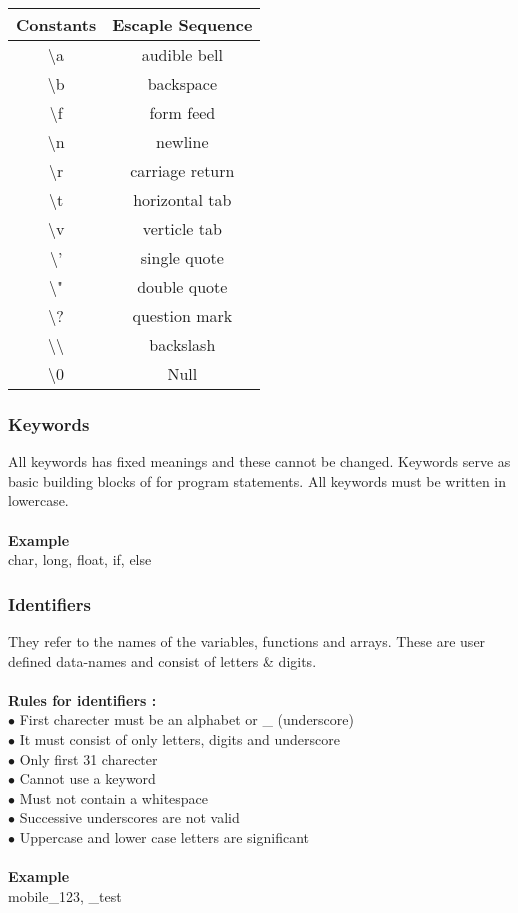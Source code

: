 \documentclass{article}
\begin{document}
	\begin{tabular}{|c|c|}
		\hline
		Constants & Escaple Sequence \\
		\hline
		\textbackslash a & audible bell \\
		\textbackslash b & backspace \\
		\textbackslash f & form feed \\
		\textbackslash n & newline \\
		\textbackslash r & carriage return \\
		\textbackslash t & horizontal tab \\
		\textbackslash v & verticle tab \\
		\textbackslash ' & single quote \\
		\textbackslash " & double quote \\
		\textbackslash ? & question mark \\
		\textbackslash\textbackslash & backslash \\
		\textbackslash 0 & Null \\
		\hline
	\end{tabular}

	\subsubsection{Keywords}
	All keywords has fixed meanings and these cannot be changed. Keywords serve as basic building blocks of for program statements. All keywords must be written in lowercase.
	\\ \\
	\textbf{Example} \\
	char, long, float, if, else
	
	\subsubsection{Identifiers}
	They refer to the names of the variables, functions and arrays. These are user defined data-names and consist of letters \& digits.
	\\ \\
	\textbf{Rules for identifiers :} \\
	$\bullet$ First charecter must be an alphabet or \_ (underscore) \\
	$\bullet$ It must consist of only letters, digits and underscore \\
	$\bullet$ Only first 31 charecter \\
	$\bullet$ Cannot use a keyword \\
	$\bullet$ Must not contain a whitespace \\
	$\bullet$ Successive underscores are not valid \\
	$\bullet$ Uppercase and lower case letters are significant
	\\ \\
	\textbf{Example} \\
	mobile\_123, \_test
	
\end{document}
